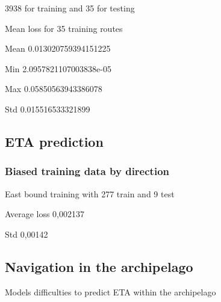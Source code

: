 \documentclass[../main.tex]{subfiles}
\begin{document}
3938 for training and 35 for testing

Mean loss for 35 training routes

Mean 0.013020759394151225 

Min 2.0957821107003838e-05 

Max 0.05850563943386078 

Std 0.015516533321899

\subsection{ETA prediction}

\subsubsection{Biased training data by direction}
East bound training with 277 train and 9 test

Average loss 0,002137

Std 0,00142
\subsection{Navigation in the archipelago}

Models difficulties to predict ETA within the archipelago
\end{document}

